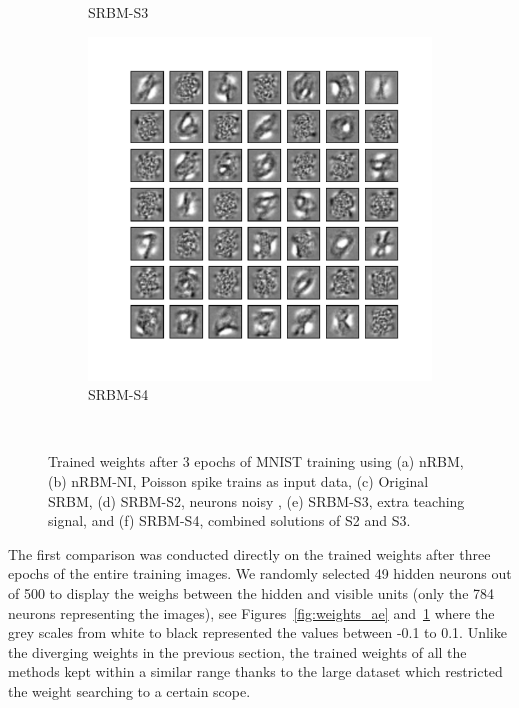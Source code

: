 \begin{figure}
\begin{subfigure}[t]{0.4\textwidth}
		\caption{SRBM-S3}
	\end{subfigure}
	\begin{subfigure}[t]{0.4\textwidth}
		\includegraphics[width=\textwidth]{pics_sdlm/53_MNIST_SRBM_all/2_60000_0.pdf}
		\caption{SRBM-S4}
	\end{subfigure}\\
	\caption{Trained weights after 3 epochs of MNIST training using (a) nRBM, (b) nRBM-NI, Poisson spike trains as input data, (c) Original SRBM, (d) SRBM-S2, neurons \DIFdelbeginFL {}\DIFdelendFL \DIFaddbeginFL {}\DIFaddendFL noisy \DIFdelbeginFL {}\DIFdelendFL \DIFaddbeginFL {}\DIFaddendFL , (e) SRBM-S3, extra teaching signal, and (f) SRBM-S4, combined solutions of S2 and S3.}
	\label{fig:weights_rbm}
\end{figure}

The first comparison was conducted directly on the trained weights after three epochs of the entire training images.
We randomly selected 49 hidden neurons out of 500 to display the weighs between the hidden and visible units (only the 784 neurons representing the images), see Figures~\ref{fig:weights_ae} and~\ref{fig:weights_rbm} where the grey scales from white to black represented the values between -0.1 to 0.1.
Unlike the diverging weights in the previous section, the trained weights of all the methods kept within a similar range thanks to the large dataset which restricted the weight searching to a certain scope.  



